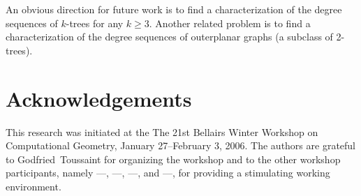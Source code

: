 \documentclass[lotsofwhite,charterfonts]{patmorin}
\begin{document}
An obvious direction for future work is to find a characterization of
the degree sequences of $k$-trees for any $k\ge 3$.  Another related
problem is to find a characterization of the degree sequences of
outerplanar graphs (a subclass of 2-trees).

\section{Acknowledgements}

This research was initiated at the The 21st Bellairs Winter Workshop
on Computational Geometry, January 27--February 3, 2006.  The authors
are grateful to Godfried~Toussaint for organizing the workshop and to
the other workshop participants, namely
---,
---,
---, and
---,
for providing a stimulating working environment.




\end{document}
